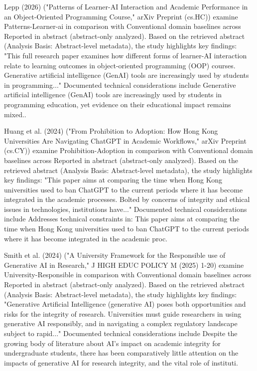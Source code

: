 \documentclass[10pt,twocolumn,letterpaper]{article}
\begin{document}
Lepp (2026) \cite{ref5} ("Patterns of Learner-AI Interaction and Academic Performance in an Object-Oriented Programming Course," arXiv Preprint (cs.HC)) examine Patterns-Learner-ai in comparison with Conventional domain baselines across Reported in abstract (abstract-only analyzed). Based on the retrieved abstract (Analysis Basis: Abstract-level metadata), the study highlights key findings: "This full research paper examines how different forms of learner-AI interaction relate to learning outcomes in object-oriented programming (OOP) courses. Generative artificial intelligence (GenAI) tools are increasingly used by students in programming..." Documented technical considerations include Generative artificial intelligence (GenAI) tools are increasingly used by students in programming education, yet evidence on their educational impact remains mixed..

Huang et al. (2024) \cite{ref6} ("From Prohibition to Adoption: How Hong Kong Universities Are Navigating ChatGPT in Academic Workflows," arXiv Preprint (cs.CY)) examine Prohibition-Adoption in comparison with Conventional domain baselines across Reported in abstract (abstract-only analyzed). Based on the retrieved abstract (Analysis Basis: Abstract-level metadata), the study highlights key findings: "This paper aims at comparing the time when Hong Kong universities used to ban ChatGPT to the current periods where it has become integrated in the academic processes. Bolted by concerns of integrity and ethical issues in technologies, institutions have..." Documented technical considerations include Addresses technical constraints in: This paper aims at comparing the time when Hong Kong universities used to ban ChatGPT to the current periods where it has become integrated in the academic proc.

Smith et al. (2024) \cite{ref7} ("A University Framework for the Responsible use of Generative AI in Research," J HIGH EDUC POLICY M (2025) 1-20) examine University-Responsible in comparison with Conventional domain baselines across Reported in abstract (abstract-only analyzed). Based on the retrieved abstract (Analysis Basis: Abstract-level metadata), the study highlights key findings: "Generative Artificial Intelligence (generative AI) poses both opportunities and risks for the integrity of research. Universities must guide researchers in using generative AI responsibly, and in navigating a complex regulatory landscape subject to rapid..." Documented technical considerations include Despite the growing body of literature about AI's impact on academic integrity for undergraduate students, there has been comparatively little attention on the impacts of generative AI for research integrity, and the vital role of instituti.
\end{document}
